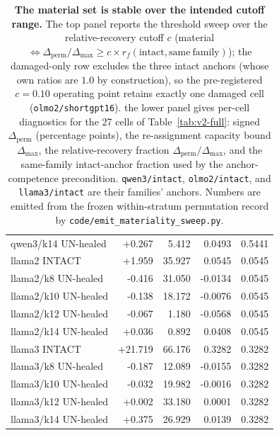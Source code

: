 \begin{table}[H]
\begin{tabular}{lrrrr}
qwen3/k14 UN-healed & +0.267 & 5.412 & 0.0493 & 0.5441 \\
llama2 INTACT & +1.959 & 35.927 & 0.0545 & 0.0545 \\
llama2/k8 UN-healed & -0.416 & 31.050 & -0.0134 & 0.0545 \\
llama2/k10 UN-healed & -0.138 & 18.172 & -0.0076 & 0.0545 \\
llama2/k12 UN-healed & -0.067 & 1.180 & -0.0568 & 0.0545 \\
llama2/k14 UN-healed & +0.036 & 0.892 & 0.0408 & 0.0545 \\
llama3 INTACT & +21.719 & 66.176 & 0.3282 & 0.3282 \\
llama3/k8 UN-healed & -0.187 & 12.089 & -0.0155 & 0.3282 \\
llama3/k10 UN-healed & -0.032 & 19.982 & -0.0016 & 0.3282 \\
llama3/k12 UN-healed & +0.002 & 33.180 & 0.0001 & 0.3282 \\
llama3/k14 UN-healed & +0.375 & 26.929 & 0.0139 & 0.3282 \\
\bottomrule
\end{tabular}
\caption{\textbf{The material set is stable over the intended cutoff range.} The top panel reports the threshold sweep over the relative-recovery cutoff $c$ (material $\Leftrightarrow \Delta_{\mathrm{perm}}/\Delta_{\max} \ge c \times r_f(\mathrm{intact, same\ family})$); the damaged-only row excludes the three intact anchors (whose own ratios are $1.0$ by construction), so the pre-registered $c=0.10$ operating point retains exactly one damaged cell (\texttt{olmo2/shortgpt16}). the lower panel gives per-cell diagnostics for the 27 cells of Table~\ref{tab:v2-full}: signed $\Delta_{\mathrm{perm}}$ (percentage points), the re-assignment capacity bound $\Delta_{\max}$, the relative-recovery fraction $\Delta_{\mathrm{perm}}/\Delta_{\max}$, and the same-family intact-anchor fraction used by the anchor-competence precondition. \texttt{qwen3/intact}, \texttt{olmo2/intact}, and \texttt{llama3/intact} are their families' anchors. Numbers are emitted from the frozen within-stratum permutation record by \texttt{code/emit\_materiality\_sweep.py}.}
\label{tab:materiality-diagnostics}
\end{table}
